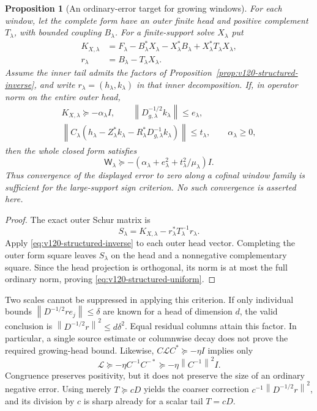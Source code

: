 \documentclass[11pt]{article}
\newtheorem{proposition}[theorem]{Proposition}
\theoremstyle{remark}
\newcommand{\norm}[1]{\left\lVert #1\right\rVert}
\begin{document}
\begin{proposition}[An ordinary-error target for growing windows]
\label{prop:v120-structured-uniform}
For each window, let the complete form have an outer finite head
and positive complement $T_\lambda$, with bounded coupling
$B_\lambda$. For a finite-support solve $X_\lambda$ put
\[
 \begin{split}
 K_{X,\lambda}&=F_\lambda-B_\lambda^*X_\lambda
       -X_\lambda^*B_\lambda+X_\lambda^*T_\lambda X_\lambda,\\
 r_\lambda&=B_\lambda-T_\lambda X_\lambda.
 \end{split}
\]
Assume the inner tail admits the factors of
Proposition~\ref{prop:v120-structured-inverse}, and write
$r_\lambda=(h_\lambda,k_\lambda)$ in that inner decomposition.
If, in operator norm on the entire outer head,
\[
 \begin{gathered}
 K_{X,\lambda}\succeq-\alpha_\lambda I,\qquad
 \norm{D_{g,\lambda}^{-1/2}k_\lambda}\le e_\lambda,\\
 \norm{C_\lambda(h_\lambda-Z_\lambda^*k_\lambda
       -R_\lambda^*D_{g,\lambda}^{-1}k_\lambda)}\le t_\lambda,
 \qquad \alpha_\lambda\ge0,
 \end{gathered}
\]
then the whole closed form satisfies
\begin{equation}\label{eq:v120-structured-uniform}
 \mathsf W_\lambda\succeq
 -\left(\alpha_\lambda+e_\lambda^2+
               t_\lambda^2/\mu_\lambda\right)I.
\end{equation}
Thus convergence of the displayed error to zero along a cofinal
window family is sufficient for the large-support sign criterion.
No such convergence is asserted here.
\end{proposition}
\begin{proof}
The exact outer Schur matrix is
\[
 S_\lambda=K_{X,\lambda}-r_\lambda^*T_\lambda^{-1}r_\lambda.
\]
Apply \eqref{eq:v120-structured-inverse} to each outer head vector.
Completing the outer form square leaves $S_\lambda$ on the head
and a nonnegative complementary square. Since the head projection
is orthogonal, its norm is at most the full ordinary norm, proving
\eqref{eq:v120-structured-uniform}.
\end{proof}

Two scales cannot be suppressed in applying this criterion.
If only individual bounds
$\norm{D^{-1/2}r e_j}\le\delta$ are known for a head of
dimension $d$, the valid conclusion is
$\norm{D^{-1/2}r}^2\le d\delta^2$. Equal residual columns
attain this factor. In particular, a single source estimate or
columnwise decay does not prove the required growing-head bound.
Likewise, $C\mathcal L C^*\succeq-\eta I$ implies only
\[
 \mathcal L\succeq-\eta C^{-1}C^{-*}
             \succeq-\eta\norm{C^{-1}}^2I.
\]
Congruence preserves positivity, but it does not preserve the size
of an ordinary negative error. Using merely $T\succeq cD$
yields the coarser correction
$c^{-1}\norm{D^{-1/2}r}^2$, and its division by $c$ is sharp
already for a scalar tail $T=cD$.
\end{document}
